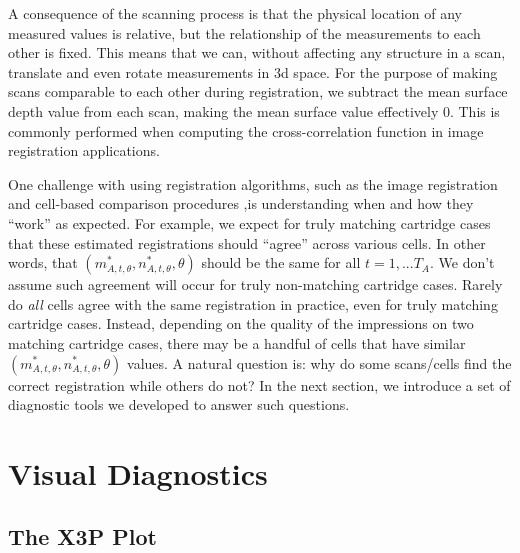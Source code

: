 \documentclass[11pt,]{isuthesis}
\begin{document}
A consequence of the scanning process is that the physical location of any measured values is relative, but the relationship of the measurements to each other is fixed. This means that we can, without affecting any structure in a scan, translate and even rotate measurements in 3d space. For the purpose of making scans comparable to each other during registration, we subtract the mean surface depth value from each scan, making the mean surface value effectively 0.
This is commonly performed when computing the cross-correlation function in image registration applications.

One challenge with using registration algorithms, such as the image registration and cell-based comparison procedures ,is understanding when and how they ``work'' as expected.
For example, we expect for truly matching cartridge cases that these estimated registrations should ``agree'' across various cells.
In other words, that \((m^*_{A,t,\theta},n^*_{A,t,\theta}, \theta)\) should be the same for all \(t = 1,...T_A\).
We don't assume such agreement will occur for truly non-matching cartridge cases.
Rarely do \emph{all} cells agree with the same registration in practice, even for truly matching cartridge cases.
Instead, depending on the quality of the impressions on two matching cartridge cases, there may be a handful of cells that have similar \((m^*_{A,t,\theta},n^*_{A,t,\theta}, \theta)\) values.
A natural question is: why do some scans/cells find the correct registration while others do not?
In the next section, we introduce a set of diagnostic tools we developed to answer such questions.

\hypertarget{visual-diagnostics-1}{%
\section{Visual Diagnostics}\label{visual-diagnostics-1}}

\hypertarget{the-x3p-plot}{%
\subsection{The X3P Plot}\label{the-x3p-plot}}
\end{document}
